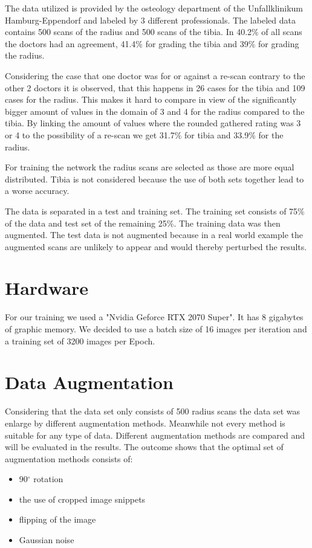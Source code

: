 \documentclass[
a4paper, 
12pt,
grayscalebody, %
abstract=on,
twoside, BCOR10mm, 12pt, DIV13,headinclude, footexclude, final, abstracton, openright
]{ibireprt}
\numberwithin{equation}{chapter}
\numberwithin{table}{chapter}
\numberwithin{figure}{chapter}
\numberwithin{algorithm}{chapter}
\numberwithin{example}{chapter}
\numberwithin{example}{chapter}
\begin{document}
The data utilized is provided by the osteology department of the Unfallklinikum Hamburg-Eppendorf and labeled by 3 different professionals.
The labeled data contains 500 scans of the radius and 500 scans of the tibia. In  40.2\% of all scans the doctors had an agreement, 41.4\% for grading the tibia and 39\% for grading the radius. 

Considering the case that one doctor was for or against a re-scan contrary to the other 2 doctors it is observed, that this happens in 26 cases for the tibia and 109 cases for the radius. This makes it hard to compare in view of the significantly bigger amount of values in the domain of 3 and 4 for the radius compared to the tibia. By linking the amount of values where the rounded gathered rating was 3 or 4 to the possibility of a re-scan we get 31.7\% for tibia and 33.9\% for the radius.  %

For training the network the radius scans are selected as those are more equal distributed. Tibia is not considered because the use of both sets together lead to a worse accuracy.

The data is separated in a test and training set. The training set consists of 75\% of the data and test set of the remaining 25\%. The training data was then augmented. The test data is not augmented because in a real world example the augmented scans are unlikely to appear and would thereby perturbed the results. 
\section{Hardware}
For our training we used a "Nvidia Geforce RTX 2070 Super". It has 8 gigabytes of graphic memory. We decided to use a batch size of 16 images per iteration and a training set of 3200 images per Epoch. 

\section{Data Augmentation}
Considering that the data set only consists of 500 radius scans the data set was enlarge by different augmentation methods. Meanwhile not every method is suitable for any type of data. Different augmentation methods are compared and will be evaluated in the results. The outcome shows that the optimal set of augmentation methods consists of:

\begin{itemize}
	\item 90$^{\circ}$ rotation
		\item the use of cropped image snippets 
	\item flipping of the image
	\item Gaussian noise

\end{itemize}
\end{document}
